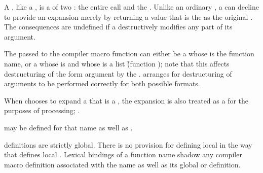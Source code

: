 A , like a ,
is a  of two : the entire call 
and the . Unlike an ordinary , a 
 can decline to provide an expansion merely by
returning a value that is the  as the original .
The consequences are undefined if a 
destructively modifies any part of its  argument.
 
The  passed to the compiler macro function can either be a 
whose  is the function name, or a  whose  is
 and whose  is a list \f{(function )};
note that this affects destructuring of the form argument by the 
.
 arranges for destructuring of arguments to be
performed correctly for both possible formats.


When  chooses to expand a  that is
a  , the expansion is also treated as a 
for the purposes of  processing; \seesection\TopLevelForms.

\endsubsubsubsection%

 
 may be defined for  that name
 as well as .  

 definitions are strictly global.  There is no provision
for defining local  in the way that 
defines local .  Lexical bindings of a function name shadow any
compiler macro definition associated with the name as well as its 
global  or  definition.
 
